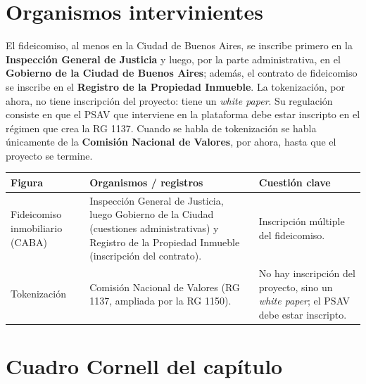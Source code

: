 \documentclass[12pt,oneside]{book}
\begin{document}
\section{Organismos intervinientes}

El fideicomiso, al menos en la Ciudad de Buenos Aires, se inscribe primero en la \textbf{Inspección General de Justicia} y luego, por la parte administrativa, en el \textbf{Gobierno de la Ciudad de Buenos Aires}; además, el contrato de fideicomiso se inscribe en el \textbf{Registro de la Propiedad Inmueble}. La tokenización, por ahora, no tiene inscripción del proyecto: tiene un \textit{white paper}. Su regulación consiste en que el PSAV que interviene en la plataforma debe estar inscripto en el régimen que crea la RG 1137. Cuando se habla de tokenización se habla únicamente de la \textbf{Comisión Nacional de Valores}, por ahora, hasta que el proyecto se termine.

\begin{center}
\small
\begin{tabularx}{\textwidth}{
    >{\raggedright\arraybackslash}p{}
    >{\raggedright\arraybackslash}X
    >{\raggedright\arraybackslash}X
}
\toprule
\textbf{Figura} & \textbf{Organismos / registros} & \textbf{Cuestión clave} \\
\midrule
Fideicomiso inmobiliario (CABA) &
Inspección General de Justicia, luego Gobierno de la Ciudad (cuestiones administrativas) y Registro de la Propiedad Inmueble (inscripción del contrato). &
Inscripción múltiple del fideicomiso. \\
\addlinespace
Tokenización &
Comisión Nacional de Valores (RG 1137, ampliada por la RG 1150). &
No hay inscripción del proyecto, sino un \textit{white paper}; el PSAV debe estar inscripto. \\
\bottomrule
\end{tabularx}
\end{center}

\section{Cuadro Cornell del capítulo}
\end{document}
